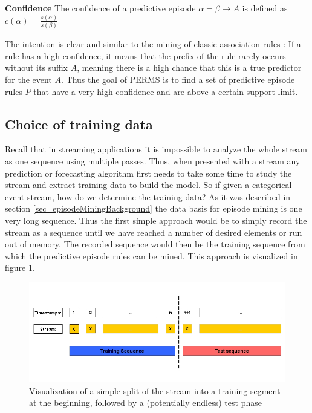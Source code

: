 \begin{mydef}
\label{def_confidence}
\textbf{Confidence} The confidence of a predictive episode $\alpha = \beta \rightarrow A$ is defined as $c(\alpha) = \frac{s(\alpha)}{s(\beta)}$ \cite{meger2004constraint}
\end{mydef}

The intention is clear and similar to the mining of classic association rules \cite{agrawal1994fast}: If a rule has a high confidence, it means that the prefix of the rule rarely occurs without its suffix $A$, meaning there is a high chance that this is a true predictor for the event $A$. Thus the goal of PERMS is to find a set of predictive episode rules $P$ that have a very high confidence and are above a certain support limit.

\subsection{Choice of training data}
Recall that in streaming applications it is impossible to analyze the whole stream as one sequence using multiple passes. Thus, when presented with a stream any prediction or forecasting algorithm first needs to take some time to study the stream and extract training data to build the model. So if given a categorical event stream, how do we determine the training data? As it was described in section \ref{sec_episodeMiningBackground} the data basis for episode mining is one very long sequence. Thus the first simple approach would be to simply record the stream as a sequence until we have reached a number of desired elements or run out of memory. The recorded sequence would then be the training sequence from which the predictive episode rules can be mined. This approach is visualized in figure \ref{fig_trainingDataNaive}.

\begin{figure}[h]
	\centering
  	\includegraphics[width=\textwidth]{trainingDataNaive}
	\caption{Visualization of a simple split of the stream into a training segment at the beginning, followed by a (potentially endless) test phase}
	\label{fig_trainingDataNaive}
\end{figure}

